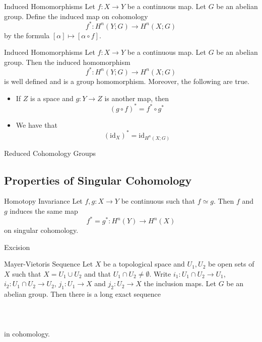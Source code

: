 \documentclass[a4paper]{article}
\begin{document}
\begin{defn}{Induced Homomorphisms}{} Let $f:X\to Y$ be a continuous map. Let $G$ be an abelian group. Define the induced map on cohomology $$f^\ast:H^n(Y;G)\to H^n(X;G)$$ by the formula $[\alpha]\mapsto[\alpha\circ f]$. 
\end{defn}

\begin{thm}{Induced Homomorphisms}{} Let $f:X\to Y$ be a continuous map. Let $G$ be an abelian group. Then the induced homomorphism $$f^\ast:H^n(Y;G)\to H^n(X;G)$$ is well defined and is a group homomorphism. Moreover, the following are true. 
\begin{itemize}
\item If $Z$ is a space and $g:Y\to Z$ is another map, then $$(g\circ f)^\ast=f^\ast\circ g^\ast$$
\item We have that $$(\text{id}_X)^\ast=\text{id}_{H^n(X;G)}$$
\end{itemize}
\end{thm}

\begin{thm}{Reduced Cohomology Groups}{}
\end{thm}

\subsection{Properties of Singular Cohomology}
\begin{thm}{Homotopy Invariance}{} Let $f,g:X\to Y$ be continuous such that $f\simeq g$. Then $f$ and $g$ induces the same map $$f^\ast=g^\ast:H^n(Y)\to H^n(X)$$ on singular cohomology. 
\end{thm}

\begin{thm}{Excision}{}
\end{thm}

\begin{thm}{Mayer-Vietoris Sequence}{} Let $X$ be a topological space and $U_1,U_2$ be open sets of $X$ such that $X=U_1\cup U_2$ and that $U_1\cap U_2\neq\emptyset$. Write $i_1:U_1\cap U_2\to U_1$, $i_2:U_1\cap U_2\to U_2$, $j_1:U_1\to X$ and $j_2:U_2\to X$ the inclusion maps. Let $G$ be an abelian group. Then there is a long exact sequence \\~\\
\\~\\
in cohomology. 
\end{thm}
\end{document}
